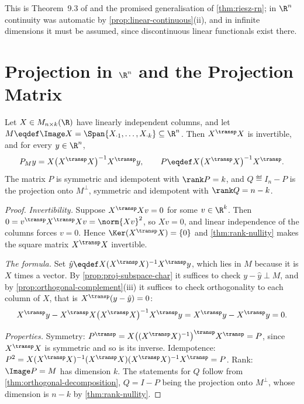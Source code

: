 This is Theorem~9.3 of \textcite[p.~304]{fukuda2026notes} and the promised
generalisation of \autoref{thm:riesz-rn}; in $\R^n$ continuity was automatic by
\autoref{prop:linear-continuous}(ii), and in infinite dimensions it must be
assumed, since discontinuous linear functionals exist there.

\section{Projection in \texorpdfstring{$\R^n$}{Rn} and the Projection Matrix}
\label{sec:proj-rn}

\begin{proposition}\label{prop:projection-matrix}
	Let $X\in M_{n\times k}(\R)$ have linearly independent columns, and let
	$M\eqdef\Image X=\Span\{X_{\cdot1},\dots,X_{\cdot k}\}\subseteq\R^n$. Then
	$X^{\transp}X$ is invertible, and for every $y\in\R^n$,
	\begin{equation}\label{eq:projection-matrix}
		P_My=X\bigl(X^{\transp}X\bigr)^{-1}X^{\transp}y,
		\qquad
		P\eqdef X\bigl(X^{\transp}X\bigr)^{-1}X^{\transp} .
	\end{equation}
	The matrix $P$ is symmetric and idempotent with $\rank P=k$, and
	$Q\eqdef I_n-P$ is the projection onto $M^{\perp}$, symmetric and idempotent
	with $\rank Q=n-k$.
\end{proposition}

\begin{proof}
	\emph{Invertibility.} Suppose $X^{\transp}Xv=0$ for some $v\in\R^k$. Then
	$0=v^{\transp}X^{\transp}Xv=\norm{Xv}^2$, so $Xv=0$, and linear independence of
	the columns forces $v=0$. Hence $\Ker(X^{\transp}X)=\{0\}$ and
	\autoref{thm:rank-nullity} makes the square matrix $X^{\transp}X$ invertible.

	\emph{The formula.} Set $\hat y\eqdef X(X^{\transp}X)^{-1}X^{\transp}y$, which
	lies in $M$ because it is $X$ times a vector. By
	\autoref{prop:proj-subspace-char} it suffices to check
	$y-\hat y\perp M$, and by \autoref{prop:orthogonal-complement}(iii) it suffices
	to check orthogonality to each column of $X$, that is
	$X^{\transp}(y-\hat y)=0$:
	\[
		X^{\transp}y-X^{\transp}X\bigl(X^{\transp}X\bigr)^{-1}X^{\transp}y
		=X^{\transp}y-X^{\transp}y=0 .
	\]

	\emph{Properties.} Symmetry: $P^{\transp}=X\bigl((X^{\transp}X)^{-1}\bigr)^{\transp}
		X^{\transp}=P$, since $X^{\transp}X$ is symmetric and so is its inverse.
	Idempotence: $P^2=X(X^{\transp}X)^{-1}(X^{\transp}X)(X^{\transp}X)^{-1}X^{\transp}=P$.
	Rank: $\Image P=M$ has dimension $k$. The statements for $Q$ follow from
	\autoref{thm:orthogonal-decomposition}, $Q=I-P$ being the projection onto
	$M^{\perp}$, whose dimension is $n-k$ by
	\autoref{thm:rank-nullity}.
\end{proof}

